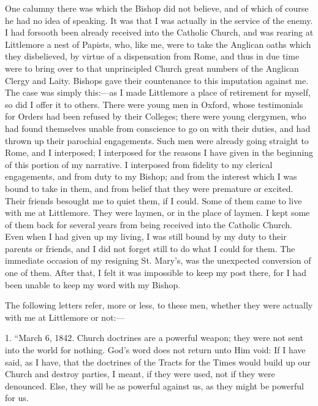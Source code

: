 One calumny there was which the Bishop did not believe, and of which
of course he had no idea of speaking. It was that I was actually in the
service of the enemy. I had forsooth been already received into
the Catholic Church, and was rearing at Littlemore a nest of Papists,
who, like me, were to take the Anglican oaths which they disbelieved, by
virtue of a dispensation from Rome, and
thus in due time were to bring over to that unprincipled Church great
numbers of the Anglican Clergy and Laity. Bishops gave their countenance
to this imputation against me. The case was simply this:—as I made
Littlemore a place of retirement for myself, so did I offer it to
others. There were young men in Oxford, whose testimonials for Orders
had been refused by their Colleges; there were young clergymen, who had
found themselves unable from conscience to go on with their duties, and
had thrown up their parochial engagements. Such men were already going
straight to Rome, and I interposed; I interposed for the reasons I have
given in the beginning of this portion of my narrative. I interposed
from fidelity to my clerical engagements, and from duty to my Bishop;
and from the interest which I was bound to take in them, and from belief
that they were premature or excited. Their friends besought me to quiet
them, if I could. Some of them came to live with me at Littlemore. They
were laymen, or in the place of laymen. I kept some of them back for
several years from being received into the Catholic Church. Even when I
had given up my living, I was still bound by my duty to their
parents or friends, and I did not forget still to do what I could for
them. The immediate occasion of my resigning St. Mary's, was the
unexpected conversion of one of them. After that, I felt it was
impossible to keep my post there, for I had been unable to keep my word
with my Bishop.

The following letters refer, more or less, to these men, whether they
were actually with me at Littlemore or not:—

1. ``March 6, 1842. Church doctrines are a powerful weapon;
they were not sent into the world for nothing. God's word does not
return unto Him void: If I have said, as I have, that the doctrines of
the Tracts for the Times would build up our Church and destroy parties,
I meant, if they were used, not if they were denounced. Else, they will
be as powerful against us, as they might be powerful for us.


